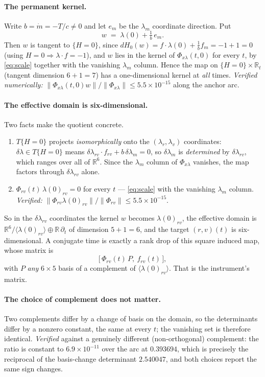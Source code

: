 \documentclass[11pt]{article}
\theoremstyle{definition}
\newcommand{\R}{\mathbb{R}}
\newcommand{\lv}{\lambda_v}
\newcommand{\lr}{\lambda_r}
\newcommand{\lm}{\lambda_m}
\newcommand{\Phixl}{\Phi_{x\lambda}}
\begin{document}
\paragraph{The permanent kernel.} Write $b=\dot m=-T/c\neq0$ and let $e_m$ be
the $\lm$ coordinate direction. Put
\[
  w \;=\; \lambda(0)+\tfrac1b\,e_m .
\]
Then $w$ is tangent to $\{H=0\}$, since
$dH_0(w)=f\!\cdot\!\lambda(0)+\tfrac1b f_m=-1+1=0$ (using $H=0\Rightarrow
\lambda\!\cdot\!f=-1$), and $w$ lies in the kernel of $\Phixl(t,0)$ for every
$t$, by \eqref{eq:scale} together with the vanishing $\lm$ column. Hence the
map on $\{H=0\}\times\R_t$ (tangent dimension $6+1=7$) has a one-dimensional
kernel at \emph{all} times. \emph{Verified numerically:}
$\|\Phixl(t,0)w\|/\|\Phixl\|\le5.5\times10^{-15}$ along the anchor arc.

\paragraph{The effective domain is six-dimensional.} Two facts make the
quotient concrete.
\begin{enumerate}
\item[(K1)] $T\{H=0\}$ projects \emph{isomorphically} onto the
  $(\lr,\lv)$ coordinates: $\delta\lambda\in T\{H=0\}$ means
  $\delta\lambda_{rv}\!\cdot\!f_{rv}+b\,\delta\lm=0$, so $\delta\lm$ is
  \emph{determined} by $\delta\lambda_{rv}$, which ranges over all of $\R^6$.
  Since the $\lm$ column of $\Phixl$ vanishes, the map factors through
  $\delta\lambda_{rv}$ alone.
\item[(K2)] $\Phi_{rv}(t)\,\lambda(0)_{rv}=0$ for every $t$ --- \eqref{eq:scale}
  with the vanishing $\lm$ column. \emph{Verified:}
  $\|\Phi_{rv}\lambda(0)_{rv}\|/\|\Phi_{rv}\|\le5.5\times10^{-15}$.
\end{enumerate}
So in the $\delta\lambda_{rv}$ coordinates the kernel $w$ becomes
$\lambda(0)_{rv}$, the effective domain is
$\R^6/\langle\lambda(0)_{rv}\rangle\oplus\R\,\partial_t$ of dimension
$5+1=6$, and the target $(r,v)(t)$ is six-dimensional. A conjugate time is
exactly a rank drop of this square induced map, whose matrix is
\[
  \big[\,\Phi_{rv}(t)\,P,\ f_{rv}(t)\,\big],
\]
with $P$ \emph{any} $6\times5$ basis of a complement of
$\langle\lambda(0)_{rv}\rangle$. That is the instrument's matrix.

\paragraph{The choice of complement does not matter.} Two complements differ
by a change of basis on the domain, so the determinants differ by a nonzero
constant, the same at every $t$; the vanishing set is therefore identical.
\emph{Verified} against a genuinely different (non-orthogonal) complement: the
ratio is constant to $6.9\times10^{-11}$ over the arc at $0.393694$, which is
precisely the reciprocal of the basis-change determinant $2.540047$, and both
choices report the same sign changes.
\end{document}
